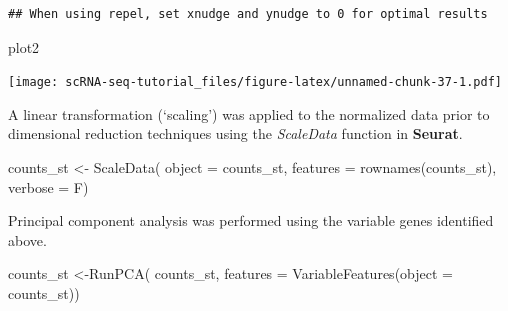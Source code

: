\documentclass[
]{book}
\newenvironment{Shaded}{\begin{snugshade}}{\end{snugshade}}
\newcommand{\AttributeTok}[1]{\textcolor[rgb]{0.77,0.63,0.00}{#1}}
\newcommand{\FunctionTok}[1]{\textcolor[rgb]{0.00,0.00,0.00}{#1}}
\newcommand{\NormalTok}[1]{#1}
\newcommand{\OtherTok}[1]{\textcolor[rgb]{0.56,0.35,0.01}{#1}}
\begin{document}
\begin{verbatim}
## When using repel, set xnudge and ynudge to 0 for optimal results
\end{verbatim}

\begin{Shaded}
\begin{Highlighting}[]
\NormalTok{plot2}
\end{Highlighting}
\end{Shaded}

\texttt{[image: scRNA-seq-tutorial\_files/figure-latex/unnamed-chunk-37-1.pdf]}

A linear transformation (`scaling') was applied to the normalized data prior to dimensional reduction techniques using the \emph{ScaleData} function in \textbf{Seurat}.

\begin{Shaded}
\begin{Highlighting}[]
\NormalTok{counts\_st }\OtherTok{\textless{}{-}}  \FunctionTok{ScaleData}\NormalTok{(}
    \AttributeTok{object =}\NormalTok{ counts\_st,}
    \AttributeTok{features =} \FunctionTok{rownames}\NormalTok{(counts\_st),}
    \AttributeTok{verbose =}\NormalTok{ F)}
\end{Highlighting}
\end{Shaded}

Principal component analysis was performed using the variable genes identified above.

\begin{Shaded}
\begin{Highlighting}[]
\NormalTok{counts\_st }\OtherTok{\textless{}{-}}\FunctionTok{RunPCA}\NormalTok{(}
\NormalTok{    counts\_st,}
    \AttributeTok{features =} \FunctionTok{VariableFeatures}\NormalTok{(}\AttributeTok{object =}\NormalTok{ counts\_st))}
\end{Highlighting}
\end{Shaded}
\end{document}
